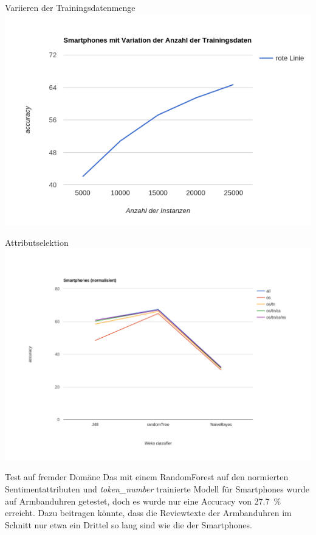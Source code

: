 \documentclass[note=hide]{beamer} %
\newcommand{\feature}[1]{\emph{#1}}
\begin{document}
\begin{frame}{Variieren der Trainingsdatenmenge}
	\includegraphics[width=\framewidth]{accuracy_smartphones_normalized_trainsize.png}
\end{frame}

\begin{frame}{Attributselektion}
	\includegraphics[width=\framewidth]{accuracy_smartphones_normalized.png}
\end{frame}

\begin{frame}{Test auf fremder Domäne}
	Das mit einem RandomForest auf den normierten Sentimentattributen und \feature{token\_number} trainierte Modell für Smartphones wurde auf Armbanduhren getestet, doch es wurde nur eine Accuracy von \SI{27.7}{\%} erreicht.
	Dazu beitragen könnte, dass die Reviewtexte der Armbanduhren im Schnitt nur etwa ein Drittel so lang sind wie die der Smartphones.
\end{frame}
\end{document}

